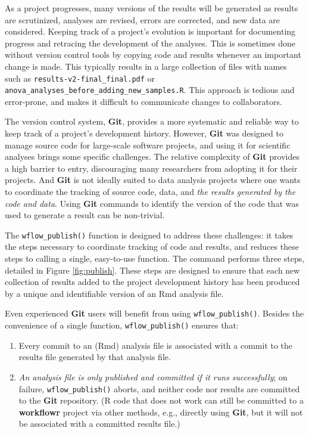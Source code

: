 \documentclass[9pt,a4paper]{extarticle}
\begin{document}
As a project progresses, many versions of the results will be generated
as results are scrutinized, analyses are revised, errors are corrected,
and new data are considered. Keeping track of a project's evolution is
important for documenting progress and retracing the development of the
analyses. This is sometimes done without version control tools by
copying code and results whenever an important change is made. This
typically results in a large collection of files with names such as
\texttt{results-v2-final\_final.pdf} or
\texttt{anova\_analyses\_before\_adding\_new\_samples.R}. This approach
is tedious and error-prone, and makes it difficult to communicate
changes to collaborators.

The version control system, \textbf{Git}, provides a more systematic and reliable
way to keep track of a project's development history. However, \textbf{Git} was
designed to manage source code for large-scale software projects, and
using it for scientific analyses brings some specific challenges. The
relative complexity of \textbf{Git} provides a high barrier to entry,
discouraging many researchers from adopting it for their projects. And
 \textbf{Git} is not ideally suited to data analysis projects where one wants to
coordinate the tracking of source code, data, and \textit{the results
generated by the code and data}. Using \textbf{Git} commands to identify the
version of the code that was used to generate a result can be
non-trivial.

The \texttt{wflow\_publish()} function is designed to address these challenges: it
takes the steps necessary to coordinate tracking of code and results,
and reduces these steps to calling a single, easy-to-use function. The
command performs three steps, detailed in Figure \ref{fig:publish}. These steps are
designed to ensure that each new collection of results added to the
project development history has been produced by a unique and
identifiable version of an Rmd analysis file.

Even experienced \textbf{Git} users will benefit from using \texttt{wflow\_publish()}.
Besides the convenience of a single function, \texttt{wflow\_publish()} ensures
that:

\begin{enumerate}

\item Every commit to an (Rmd) analysis file is associated with a commit
to the results file generated by that analysis file.

\item \textit{An analysis file is only published and committed if it
runs successfully}; on failure, \texttt{wflow\_publish()} aborts, and neither code
nor results are committed to the \textbf{Git} repository. (R code that does not
work can still be committed to a \textbf{workflowr} project via other methods,
e.g., directly using \textbf{Git}, but it will not be associated with a committed
results file.)

\end{enumerate}
\end{document}
